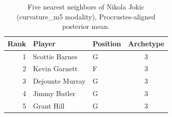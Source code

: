 \begin{table}[htbp]
  \centering\small
  \begin{tabular}{rllc}
    \toprule
    Rank & Player & Position & Archetype \\
    \midrule
    1 & Scottie Barnes & G & 3 \\
    2 & Kevin Garnett & F & 3 \\
    3 & Dejounte Murray & G & 3 \\
    4 & Jimmy Butler & G & 3 \\
    5 & Grant Hill & G & 3 \\
    \bottomrule
  \end{tabular}
  \caption{Five nearest neighbors of Nikola Jokic (curvature_m5 modality), Procrustes-aligned posterior mean.}
  \label{tab:Nikola_Jokic_neighbors_curvature_m5}
\end{table}

